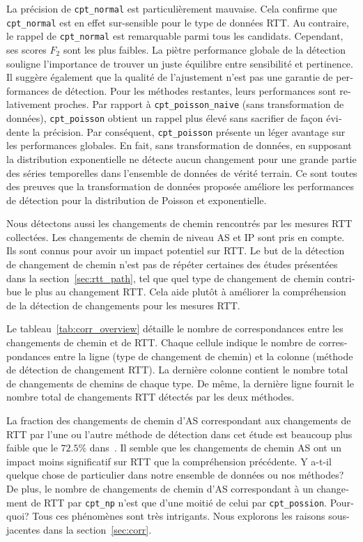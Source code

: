 \begin{otherlanguage}{french}
La précision de \texttt {cpt\_normal} est particulièrement mauvaise.
Cela confirme que \texttt{cpt\_normal} est en effet sur-sensible pour le type de données RTT.
Au contraire, le rappel de \texttt{cpt\_normal} est remarquable parmi tous les candidats.
Cependant, ses scores $F_2$ sont les plus faibles.
La piètre performance globale de la détection souligne l'importance de trouver un juste équilibre entre sensibilité et pertinence.
Il suggère également que la qualité de l'ajustement n'est pas une garantie de performances de détection.
Pour les méthodes restantes, leurs performances sont relativement proches.
Par rapport à \texttt{cpt\_poisson\_naive} (sans transformation de données), 
\texttt{cpt\_poisson} obtient un rappel plus élevé sans sacrifier de façon évidente la précision.
Par conséquent, \texttt{cpt\_poisson} présente un léger avantage sur les performances globales.
En fait, sans transformation de données, en supposant la distribution exponentielle ne détecte aucun changement pour une grande partie des séries temporelles dans l'ensemble de données de vérité terrain.
Ce sont toutes des preuves que la transformation de données proposée améliore les performances de détection pour la distribution de Poisson et exponentielle.

Nous détectons aussi les changements de chemin rencontrés par les mesures RTT collectées.
Les changements de chemin de niveau AS et IP sont pris en compte.
Ils sont connus pour avoir un impact potentiel sur RTT.
Le but de la détection de changement de chemin n'est pas de répéter certaines des études présentées dans la section~\ref{sec:rtt_path},
tel que quel type de changement de chemin contribue le plus au changement RTT.
Cela aide plutôt à améliorer la compréhension de la détection de changements pour les mesures RTT.

Le tableau~\ref{tab:corr_overview} détaille le nombre de correspondances entre les changements de chemin et de RTT.
Chaque cellule indique le nombre de correspondances entre la ligne (type de changement de chemin) et la colonne (méthode de détection de changement RTT).
La dernière colonne contient le nombre total de changements de chemins de chaque type.
De même, la dernière ligne fournit le nombre total de changements RTT détectés par les deux méthodes.

La fraction des changements de chemin d'AS correspondant aux changements de RTT par l'une ou l'autre méthode de détection dans cet étude 
est beaucoup plus faible que le $72.5\%$ dans~\cite{Rimondini2014}.
Il semble que les changements de chemin AS ont un impact moins significatif sur RTT que la compréhension précédente.
Y a-t-il quelque chose de particulier dans notre ensemble de données ou nos méthodes?
De plus, le nombre de changements de chemin d'AS correspondant à un changement de RTT par \texttt{cpt\_np} 
n'est que d'une moitié de celui par \texttt{cpt\_possion}. Pourquoi?
Tous ces phénomènes sont très intrigants.
Nous explorons les raisons sous-jacentes dans la section~\ref{sec:corr}.


\end{otherlanguage}
